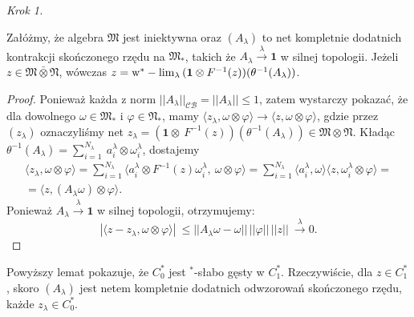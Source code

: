 {\it Krok 1.}
\begin{Lemma}
\label{lem:netinvNalg}
Załóżmy, że algebra $\mathfrak{M}$ jest iniektywna oraz
$(A_{\lambda})$ to net kompletnie dodatnich kontrakcji skończonego rzędu na
$\mathfrak{M}_{*}$, takich że
$A_{\lambda} \stackrel{\lambda}{\rightarrow} \mathbf{1}$ w silnej topologii.
Jeżeli $z \in \mathfrak{M} \bar{\otimes} \mathfrak{N}$, wówczas
$z = {\rm w}^*-\lim_{\lambda} \, (\mathbf{1} \otimes F^{-1}(z) )
(\theta^{-1} (A_{\lambda}))$.
\end{Lemma}
\begin{proof}
Ponieważ każda z norm $||A_{\lambda}||_{\mathcal{CB}} = || A_{\lambda} ||  \leq 1$,
zatem wystarczy pokazać, że dla dowolnego $\omega \in \mathfrak{M}_{*}$
i $\varphi \in \mathfrak{N}_{*}$,
mamy
$\langle z_{\lambda}, \omega \otimes \varphi\rangle{\longrightarrow}
\langle z , \omega \otimes \varphi\rangle$,
gdzie przez $(z_{\lambda})$ oznaczyliśmy net $z_{\lambda} = (\mathbf{1} \otimes \
F^{-1}(z))(\theta^{-1}(A_{\lambda})) \in \mathfrak{M} \otimes \mathfrak{N}$.
Kładąc
$\theta^{-1}(A_{\lambda}) = \sum_{i=1}^{N_{\lambda}} \
a_{i}^{\lambda} \otimes \omega_{i}^{\lambda}$, dostajemy
\begin{multline}
\langle z_{\lambda}, \omega \otimes \varphi\rangle =
\sum \limits_{i=1}^{N_{\lambda}}
\langle a_{i}^{\lambda} \otimes F^{-1}(z) \omega_{i}^{\lambda} ,\
\omega \otimes \varphi \rangle
= \sum \limits_{i=1}^{N_{\lambda}}
\langle  a_{i}^{\lambda}, \omega \rangle
\langle z,  \omega_{i}^{\lambda} \otimes \varphi \rangle = \\
= \langle z , (A_{\lambda} \omega) \otimes \varphi \rangle.
\end{multline}
Ponieważ $A_{\lambda} \stackrel{\lambda}{\rightarrow} \mathbf{1}$ w silnej topologii,
otrzymujemy:
\begin{equation}
| \langle z - z_{\lambda}, \omega\otimes \varphi \rangle | \
\leq || A_{\lambda} \omega - \omega || \, ||\varphi|| \, ||z|| \
\stackrel{\lambda}{\longrightarrow} 0.
\end{equation}
\end{proof}

\begin{Corollary}
\label{cor:denseness}
Powyższy lemat pokazuje, że $C_0^*$ jest $^{*}$-słabo gęsty w $C_1^*$.
Rzeczywiście, dla
$z \in C_{1}^{*}$, skoro $(A_{\lambda})$ jest netem kompletnie dodatnich
odwzorowań skończonego rzędu, każde $z_{\lambda} \in C_{0}^{*}$.
\end{Corollary}

